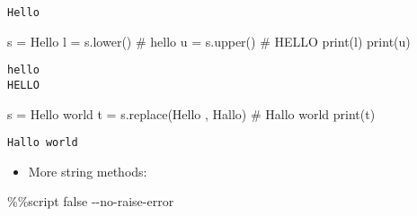 \documentclass[
  letterpaper,
  DIV=11,
  numbers=noendperiod]{scrreprt}
\newenvironment{Shaded}{\begin{snugshade}}{\end{snugshade}}
\newcommand{\BuiltInTok}[1]{\textcolor[rgb]{0.00,0.46,0.62}{#1}}
\newcommand{\BuiltInTok}[1]{\textcolor[rgb]{0.00,0.48,0.65}{#1}}
\newcommand{\CommentTok}[1]{\textcolor[rgb]{0.37,0.37,0.37}{#1}}
\newcommand{\ControlFlowTok}[1]{\textcolor[rgb]{0.00,0.46,0.62}{#1}}
\newcommand{\ControlFlowTok}[1]{\textcolor[rgb]{0.00,0.48,0.65}{#1}}
\newcommand{\NormalTok}[1]{\textcolor[rgb]{0.00,0.46,0.62}{#1}}
\newcommand{\OperatorTok}[1]{\textcolor[rgb]{0.37,0.37,0.37}{#1}}
\newcommand{\NormalTok}[1]{\textcolor[rgb]{0.00,0.48,0.65}{#1}}
\newcommand{\OperatorTok}[1]{\textcolor[rgb]{0.37,0.37,0.37}{#1}}
\newcommand{\StringTok}[1]{\textcolor[rgb]{0.13,0.47,0.30}{#1}}
\providecommand{\tightlist}{%
  \setlength{\itemsep}{0pt}\setlength{\parskip}{0pt}}
\begin{document}
\begin{Shaded}
\begin{Highlighting}[]
\begin{verbatim}
Hello
\end{verbatim}

\begin{Shaded}
\begin{Highlighting}[]
\NormalTok{s }\OperatorTok{=} \StringTok{\textquotesingle{}Hello\textquotesingle{}}
\NormalTok{l }\OperatorTok{=}\NormalTok{ s.lower()     }\CommentTok{\# \textquotesingle{}hello\textquotesingle{}}
\NormalTok{u }\OperatorTok{=}\NormalTok{ s.upper()     }\CommentTok{\# \textquotesingle{}HELLO}
\BuiltInTok{print}\NormalTok{(l)}
\BuiltInTok{print}\NormalTok{(u)}
\end{Highlighting}
\end{Shaded}

\begin{verbatim}
hello
HELLO
\end{verbatim}

\begin{Shaded}
\begin{Highlighting}[]
\NormalTok{s }\OperatorTok{=} \StringTok{\textquotesingle{}Hello world\textquotesingle{}}
\NormalTok{t }\OperatorTok{=}\NormalTok{ s.replace(}\StringTok{\textquotesingle{}Hello\textquotesingle{}}\NormalTok{ , }\StringTok{\textquotesingle{}Hallo\textquotesingle{}}\NormalTok{)   }\CommentTok{\# \textquotesingle{}Hallo world\textquotesingle{}}
\BuiltInTok{print}\NormalTok{(t)}
\end{Highlighting}
\end{Shaded}

\begin{verbatim}
Hallo world
\end{verbatim}

\begin{itemize}
\tightlist
\item
  More string methods:
\end{itemize}

\begin{Shaded}
\begin{Highlighting}[]
\OperatorTok{\%\%}\NormalTok{script false }\OperatorTok{{-}{-}}\NormalTok{no}\OperatorTok{{-}}\ControlFlowTok{raise}\OperatorTok{{-}}\NormalTok{error}


\end{Highlighting}
\end{Shaded}
\end{Highlighting}
\end{Shaded}
\end{document}
